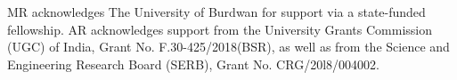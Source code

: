 \documentclass[%
reprint,
superscriptaddress,
amsmath,amssymb,
aps,
prb,
showkeys,
]{revtex4-2}
\begin{document}
\begin{acknowledgments}
MR acknowledges The University of Burdwan for support via a state-funded fellowship. AR acknowledges support from the University Grants Commission (UGC) of India, Grant No. F.30-425/2018(BSR), as well as from the Science and Engineering Research Board (SERB), Grant No. CRG/20l8/004002.
\end{acknowledgments}


\end{document}
